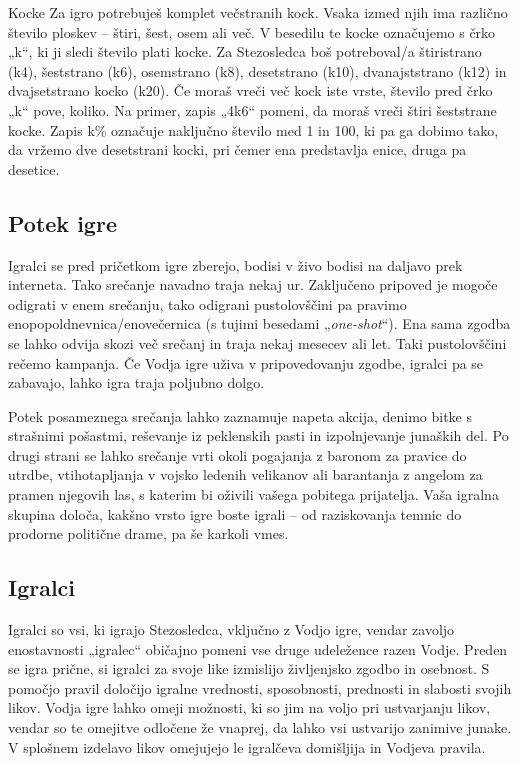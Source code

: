 \begin{rpg-titlebox}{Kocke}
    \label{sidenote-kocke}
    Za igro potrebuješ komplet večstranih kock. Vsaka izmed njih ima različno število ploskev -- štiri, šest, osem ali več. V besedilu te kocke označujemo s črko „k“, ki ji sledi število plati kocke. Za Stezosledca boš potreboval/a štiristrano (k4), šeststrano (k6), osemstrano (k8), desetstrano (k10), dvanajststrano (k12) in dvajsetstrano kocko (k20). Če moraš vreči več kock iste vrste, število pred črko „k“ pove, koliko. Na primer, zapis „4k6“ pomeni, da moraš vreči štiri šeststrane kocke. Zapis k\% označuje naključno število med 1 in 100, ki pa ga dobimo tako, da vržemo dve desetstrani kocki, pri čemer ena predstavlja enice, druga pa desetice.
\end{rpg-titlebox}

\subsection{Potek igre}

Igralci se pred pričetkom igre zberejo, bodisi v živo bodisi na daljavo prek interneta. Tako srečanje navadno traja nekaj ur. Zaključeno pripoved je mogoče odigrati v enem srečanju, tako odigrani pustolovščini pa pravimo enopopoldnevnica/enovečernica (s tujimi besedami „\textit{one-shot}“). Ena sama zgodba se lahko odvija skozi več srečanj in traja nekaj mesecev ali let. Taki pustolovščini rečemo kampanja. Če Vodja igre uživa v pripovedovanju zgodbe, igralci pa se zabavajo, lahko igra traja poljubno dolgo.

Potek posameznega srečanja lahko zaznamuje napeta akcija, denimo bitke s strašnimi pošastmi, reševanje iz peklenskih pasti in izpolnjevanje junaških del. Po drugi strani se lahko srečanje vrti okoli pogajanja z baronom za pravice do utrdbe, vtihotapljanja v vojsko ledenih velikanov ali barantanja z angelom za pramen njegovih las, s katerim bi oživili vašega pobitega prijatelja. Vaša igralna skupina določa, kakšno vrsto igre boste igrali -- od raziskovanja temnic do prodorne politične drame, pa še karkoli vmes.

\subsection{Igralci}

Igralci so vsi, ki igrajo Stezosledca, vključno z Vodjo igre, vendar zavoljo enostavnosti „igralec“ običajno pomeni vse druge udeležence razen Vodje. Preden se igra prične, si igralci za svoje like izmislijo življenjsko zgodbo in osebnost. S pomočjo pravil določijo igralne vrednosti, sposobnosti, prednosti in slabosti svojih likov. Vodja igre lahko omeji možnosti, ki so jim na voljo pri ustvarjanju likov, vendar so te omejitve odločene že vnaprej, da lahko vsi ustvarijo zanimive junake. V splošnem izdelavo likov omejujejo le igralčeva domišljija in Vodjeva pravila.

